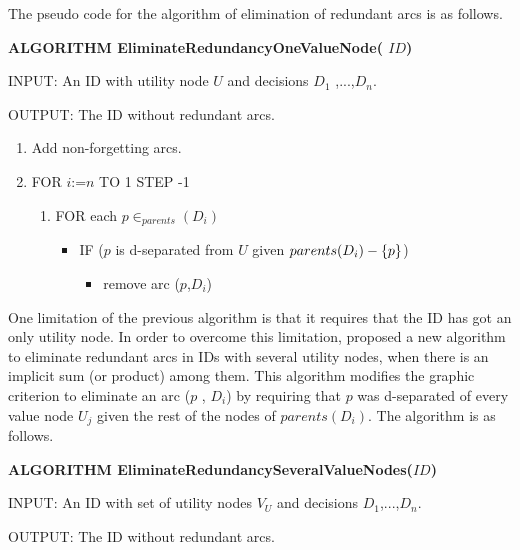 The pseudo code for the algorithm of elimination of redundant arcs is as
follows.

\bigskip \noindent \textsf{\textbf{ALGORITHM EliminateRedundancyOneValueNode(%
$ID$)}}

\bigskip \noindent INPUT: An ID with utility node $U$ and decisions $D_{1}$%
,...,$D_{n}$.

\noindent OUTPUT: The ID without redundant arcs.

\begin{enumerate}
\item Add non-forgetting arcs.

\item FOR $i$:=$n$ TO 1 STEP -1

\begin{enumerate}
\item FOR each $p\in _{parents}(D_{i})$

\begin{itemize}
\item IF ($p$ is d-separated from $U$ given $parents(D_{i})-{\{p\}}$)

\begin{itemize}
\item remove arc ($p$,$D_{i}$)
\end{itemize}
\end{itemize}
\end{enumerate}
\end{enumerate}

One limitation of the previous algorithm is that it requires that the ID has
got an only utility node. In order to overcome this limitation, \cite%
{nilsson00} proposed a new algorithm to eliminate redundant arcs in IDs with
several utility nodes, when there is an implicit sum (or product) among
them. This algorithm modifies the graphic criterion to eliminate an arc ($p$%
, $D_{i}$) by requiring that $p$ was d-separated of every value node $U_{j}$
given the rest of the nodes of $parents(D_{i})$. The algorithm is as follows.

\bigskip \noindent \textsf{\textbf{ALGORITHM
EliminateRedundancySeveralValueNodes($ID$)}}

\bigskip \noindent INPUT: An ID with set of utility nodes $V_{U}$ and
decisions $D_{1}$,...,$D_{n}$.

\noindent OUTPUT: The ID without redundant arcs.

